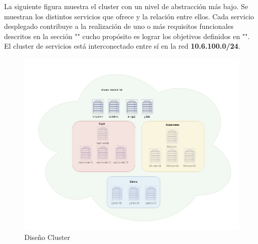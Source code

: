 \begin{text}
	La siguiente figura muestra el cluster con un nivel de abstracción más bajo. Se muestran los distintos servicios que ofrece y la relación entre ellos. Cada servicio desplegado contribuye a la realización de uno o más requisitos funcionales descritos en la sección "" cucho propósito es lograr los objetivos definidos en "". \\
	El cluster de servicios está interconectado entre sí en la red \textbf{10.6.100.0/24}.
\end{text}
\begin{figure}[!hbt]
	\centering
	\includegraphics[scale=0.40]{imagenes/Diseno/diagrama_cluster_2.png}
	\caption[Diseño Cluster]{Diseño Cluster} 
	\label{cluster_design}
\end{figure}

